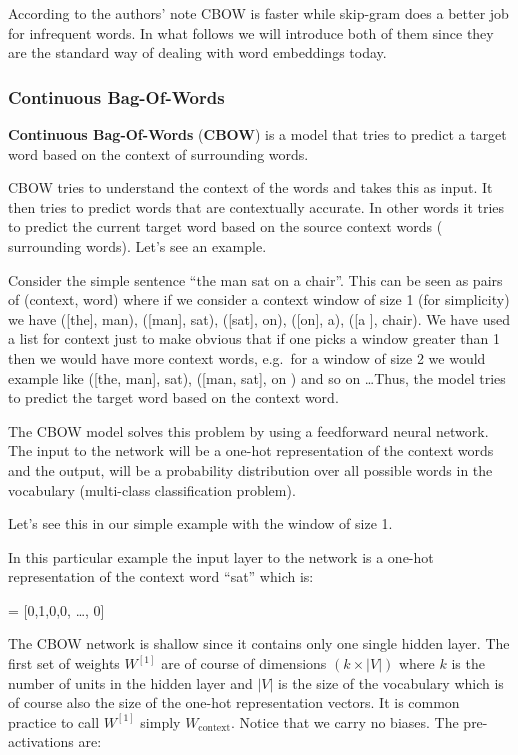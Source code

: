 According to the authors' note CBOW is faster while skip-gram does a better job for infrequent words. In what follows
we will introduce both of them since they are the standard way of dealing with word embeddings today.

\subsubsection{Continuous Bag-Of-Words}

\textbf{Continuous Bag-Of-Words} (\textbf{CBOW}) is a model that tries to predict a target word based on the context of
surrounding words.
\ed

CBOW  tries to understand the context of the words and takes this as input. It then tries to predict words that are
contextually accurate. In other words it tries to predict the current target word based on the source context words (
surrounding words). Let's see an example.

\be
Consider the simple sentence ``the man sat on a chair''. This can be seen as pairs of (context, word) where if we
consider a context window of size 1 (for simplicity) we have ([the], man), ([man], sat), ([sat], on), ([on], a), ([a
], chair). We have used a list for context just to make obvious that if one picks a window greater than 1 then we
would have more context words, e.g.\ for a window of size 2 we would example like ([the, man], sat), ([man, sat], on
) and so on \ldots Thus, the model tries to predict the target word based on the context word.
\ee

The CBOW model solves this problem by using a feedforward neural network. The input to the network will be a one-hot
representation of the context words and the output, will be a probability distribution over all possible words in the
vocabulary (multi-class classification problem).

\be
Let's see this in our simple example with the window of size 1.

\vspace{-10pt}

In this particular example the input layer to the network is a one-hot representation of the context word ``sat''
which is:

\bse
{} = [0,1,0,0, \ldots, 0]
\ese
\ee

The CBOW network is shallow since it contains only one single hidden layer. The first set of weights $W^{[1]}$ are of
course of dimensions $(k \times |V|)$ where $k$ is the number of units in the hidden layer and $|V|$ is the size of
the vocabulary which is of course also the size of the one-hot representation vectors. It is common practice to call
$W^{[1]}$ simply $W_{\text{context}}$. Notice that we carry no biases. The pre-activations are:

